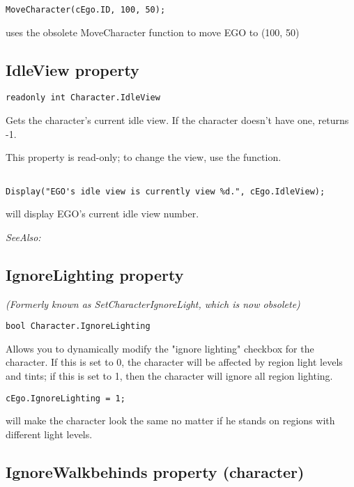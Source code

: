 \begin{verbatim}
MoveCharacter(cEgo.ID, 100, 50);
\end{verbatim}
uses the obsolete MoveCharacter function to move EGO to (100, 50)


\subsection{IdleView property}\label{Character.IdleView}%

\begin{verbatim}
readonly int Character.IdleView
\end{verbatim}
Gets the character's current idle view. If the character doesn't have one, returns -1.

This property is read-only; to change the view, use the 
function.

\begin{verbatim}

Display("EGO's idle view is currently view %d.", cEgo.IdleView);
\end{verbatim}
will display EGO's current idle view number.

\it{SeeAlso:} 


\subsection{IgnoreLighting property}\label{Character.IgnoreLighting}%

\it{(Formerly known as SetCharacterIgnoreLight, which is now obsolete)}

\begin{verbatim}
bool Character.IgnoreLighting
\end{verbatim}
Allows you to dynamically modify the "ignore lighting" checkbox for the
character. If this is set to 0, the character will be affected by region light
levels and tints; if this is set to 1, then the character will ignore all
region lighting.

\begin{verbatim}
cEgo.IgnoreLighting = 1;
\end{verbatim}
will make the character look the same no matter if he stands on regions with
different light levels.


\subsection{IgnoreWalkbehinds property (character)}\label{Character.IgnoreWalkbehinds}%

